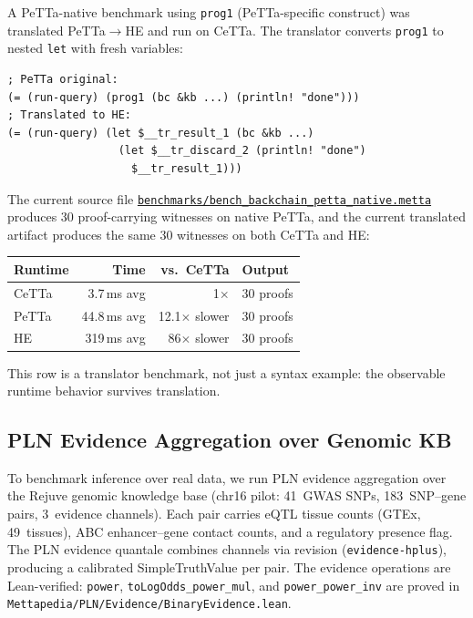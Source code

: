 \documentclass[11pt]{article}
\newcommand{\code}[1]{\texttt{#1}}
\newcommand{\PeTTa}{\textup{PeTTa}}
\newcommand{\HE}{\textup{HE}}
\newcommand{\CeTTa}{\textup{CeTTa}}
\begin{document}
A PeTTa-native benchmark using \code{prog1} (PeTTa-specific construct)
was translated PeTTa$\to$HE and run on \CeTTa{}.  The translator
converts \code{prog1} to nested \code{let} with fresh variables:
\begin{lstlisting}[language={},basicstyle=\ttfamily\scriptsize]
; PeTTa original:
(= (run-query) (prog1 (bc &kb ...) (println! "done")))
; Translated to HE:
(= (run-query) (let $__tr_result_1 (bc &kb ...)
                 (let $__tr_discard_2 (println! "done")
                   $__tr_result_1)))
\end{lstlisting}
The current source file
\href{https://github.com/zariuq/CeTTa/blob/07928677c0237a19b2f3c32dffca28d7d2626723/benchmarks/bench_backchain_petta_native.metta}{\code{benchmarks/bench\_backchain\_petta\_native.metta}}
produces 30 proof-carrying witnesses on native \PeTTa{}, and the
current translated artifact produces the same 30 witnesses on both
\CeTTa{} and \HE{}:
\begin{center}
\begin{tabular}{lrrl}
\toprule
Runtime & Time & vs.\ \CeTTa{} & Output \\
\midrule
\CeTTa{} & 3.7\,ms avg  & 1$\times$          & 30 proofs \\
\PeTTa{} & 44.8\,ms avg & 12.1$\times$ slower & 30 proofs \\
\HE{}    & 319\,ms avg  & 86$\times$ slower  & 30 proofs \\
\bottomrule
\end{tabular}
\end{center}
This row is a translator benchmark, not just a syntax example: the
observable runtime behavior survives translation.

\subsection{PLN Evidence Aggregation over Genomic KB}

To benchmark inference over real data, we run PLN evidence aggregation
over the Rejuve genomic knowledge base (chr16 pilot: 41~GWAS SNPs,
183~SNP--gene pairs, 3~evidence channels).  Each pair carries
eQTL tissue counts (GTEx, 49~tissues), ABC enhancer--gene contact
counts, and a regulatory presence flag.  The PLN evidence quantale
combines channels via revision (\code{evidence-hplus}), producing a
calibrated SimpleTruthValue per pair.  The evidence operations are
Lean-verified: \code{power}, \code{toLogOdds\_power\_mul}, and
\code{power\_power\_inv} are proved in
\code{Mettapedia/PLN/Evidence/BinaryEvidence.lean}.
\end{document}
